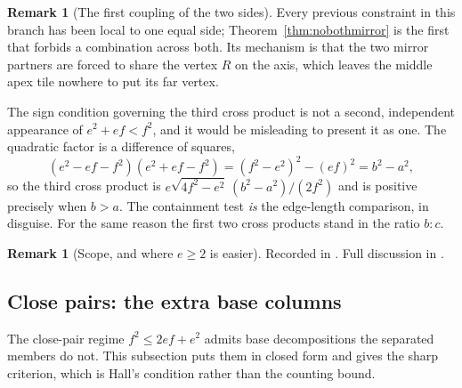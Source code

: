 \documentclass[11pt,reqno]{amsart}
\theoremstyle{plain}
\theoremstyle{definition}
\newtheorem{remark}[theorem]{Remark}
\begin{document}
\begin{remark}[The first coupling of the two sides]\label{rem:coupling}
Every previous constraint in this branch has been local to one equal side; Theorem~\ref{thm:nobothmirror}
is the first that forbids a combination across both. Its mechanism is that the two mirror partners are
forced to share the vertex $R$ on the axis, which leaves the middle apex tile nowhere to put its far
vertex.

The sign condition governing the third cross product is not a second, independent appearance of
$e^{2}+ef<f^{2}$, and it would be misleading to present it as one. The quadratic factor is a
difference of squares,
\[
(e^{2}-ef-f^{2})(e^{2}+ef-f^{2})=(f^{2}-e^{2})^{2}-(ef)^{2}=b^{2}-a^{2},
\]
so the third cross product is $e\sqrt{4f^{2}-e^{2}}\,(b^{2}-a^{2})/(2f^{2})$ and is positive precisely
when $b>a$. The containment test \emph{is} the edge-length comparison, in disguise. For the same
reason the first two cross products stand in the ratio $b:c$.
\end{remark}


\begin{remark}[Scope, and where $e\ge2$ is easier]\label{rem:ptwoscopeb}
Recorded in \cite{Obstructions}. Full discussion in \cite{Obstructions}.
\end{remark}

\subsection{Close pairs: the extra base columns}\label{sub:closepairs}

The close-pair regime $f^2\le 2ef+e^2$ admits base decompositions the separated members do not.
This subsection puts them in closed form and gives the sharp criterion, which is Hall's condition
rather than the counting bound.
\end{document}

